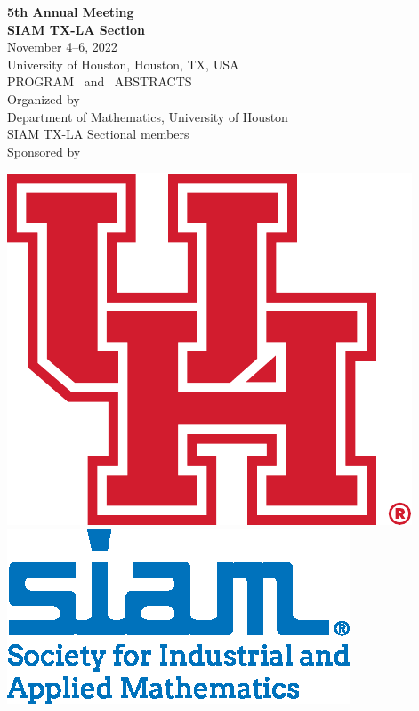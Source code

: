 \thispagestyle{empty}
\vspace*{4ex}

{\center
{\LARGE \bf 5th Annual Meeting}\\  [8mm]
{\Huge \bf SIAM TX-LA Section} \\ [8mm]

{\Large November 4--6, 2022} \\[3mm]
{\Large University of Houston, Houston, TX, USA} \\[36mm]

{\LARGE PROGRAM \ and \ ABSTRACTS}  \\ [32mm]


{\large Organized by} \\ [3mm]
{\Large Department of  Mathematics, University of Houston\\
\vspace{5pt} SIAM TX-LA Sectional members} \\ [16mm]


{\large Sponsored by}\\[3mm]
\begin{center}
\includegraphics[totalheight = 3cm]{figures/uh.pdf}
\qquad\includegraphics[totalheight = 3cm]{figures/siam_logo_blue_cobranded_stack.eps}
\end{center}
}

